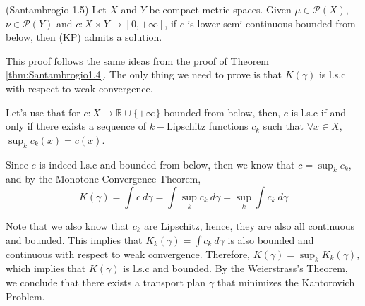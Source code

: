 \begin{theorem}(Santambrogio 1.5)
  \label{teo1.5}
  Let $X$ and $Y$ be compact metric spaces.
  Given $\mu\in \mathcal{P}(X)$, $\nu \in \mathcal P(Y)$ and
  $c:X\times Y \to[0,+\infty]$, if $c$ is lower semi-continuous
  bounded from below, then
  (KP) admits a solution.
\end{theorem}
\begin{prf}

  This proof follows the same ideas from the proof of Theorem \ref{thm:Santambrogio1.4}.
  The only thing we need to prove is that $K(\gamma)$ is l.s.c with respect to weak convergence.

  Let's use that for $c:X\to \mathbb R \cup \{+\infty\}$ bounded from below,
  then, $c$ is l.s.c if and only if there exists a sequence of
  $k-$Lipschitz  functions
  $c_k$ such that
  $\forall x \in X$, $\sup_k c_k(x) = c(x)$.

  Since $c$ is indeed l.s.c and bounded from below, then we know that $c = \sup_k c_k$, and by the
  Monotone Convergence Theorem,
  \begin{equation*}
    K(\gamma) =\int c \ d\gamma =
    \int \sup_k c_k \ d\gamma = \sup_k\int c_k \ d\gamma
  \end{equation*}

  Note that we also know that $c_k$ are Lipschitz, hence, they are also all continuous and bounded.
  This implies that $K_k(\gamma) = \int c_k \ d\gamma$ is also bounded and continuous with respect to weak convergence.
  Therefore, $K(\gamma) = \sup_k K_k(\gamma)$, which implies that $K(\gamma)$ is l.s.c and bounded.
  By the Weierstrass's Theorem, we conclude that
  there exists a transport plan $\gamma$ that minimizes the Kantorovich
  Problem.
\end{prf}

